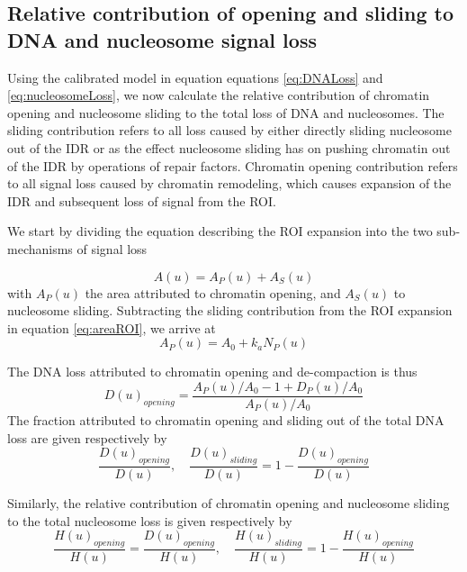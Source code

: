 \documentclass[12pt]{article}
\begin{document}
\subsection{Relative contribution of opening and sliding to DNA
	and nucleosome signal loss}

Using the calibrated model in equation equations \eqref{eq:DNALoss}  and \eqref{eq:nucleosomeLoss}, we now calculate the
relative contribution of chromatin opening and nucleosome sliding to the
total loss of DNA and nucleosomes. The sliding contribution refers to all loss
caused by either directly sliding nucleosome out of the IDR or as the effect
nucleosome sliding has on pushing chromatin out of the IDR by operations
of repair factors. Chromatin opening contribution refers to all signal loss
caused by chromatin remodeling, which causes expansion of the IDR and
subsequent loss of signal from the ROI.

We start by dividing the equation describing the ROI expansion into the
two sub-mechanisms of signal loss

\begin{equation*}
A(u) = A_P(u) +A_S(u)
\end{equation*}
with $A_P(u)$ the area attributed to chromatin opening, and $A_S(u)$ to nucleosome sliding. Subtracting the sliding contribution from the ROI expansion
in equation \eqref{eq:areaROI}, we arrive at
\begin{equation*}
A_P(u) = A_0 + k_aN_P(u)
\end{equation*}

The DNA loss attributed to chromatin opening and de-compaction is thus
\begin{equation*}
D(u)_{opening}= \frac{A_P(u)/A_0 -1 +D_P(u)/A_0}{A_P(u)/A_0}
\end{equation*}	
The fraction attributed to chromatin opening and sliding out of the total
DNA loss are given respectively by
\begin{equation}\label{eq:relativeOpeningSlidingDNA}
\frac{D(u)_{opening}}{D(u)}, \quad \frac{D(u)_{sliding}}{D(u)}=1-\frac{D(u)_{opening}}{D(u)}
\end{equation}

Similarly, the relative contribution of chromatin opening and nucleosome
sliding to the total nucleosome loss is given respectively by
\begin{equation}\label{eq:relativeOpeningSlidingNucleosomes}
\frac{H(u)_{opening}}{H(u)} = \frac{D(u)_{opening}}{H(u)},\quad \frac{H(u)_{sliding}}{H(u)}=1-\frac{H(u)_{opening}}{H(u)}
\end{equation}
\end{document}
